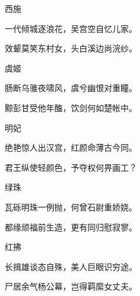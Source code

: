 \begin{poem}
    \begin{pl}西施\end{pl}


    \begin{pl}一代倾城逐浪花，吴宫空自忆儿家。\end{pl}


    \begin{pl}效颦莫笑东村女，头白溪边尚浣纱。\end{pl}
    \emptypl

    \begin{pl}虞姬\end{pl}


    \begin{pl}肠断乌骓夜啸风，虞兮幽恨对重瞳。\end{pl}


    \begin{pl}黥彭甘受他年醢，饮剑何如楚帐中。\end{pl}
    \emptypl

    \begin{pl}明妃\end{pl}


    \begin{pl}绝艳惊人出汉宫，红颜命薄古今同。\end{pl}


    \begin{pl}君王纵使轻颜色，予夺权何畀画工？\end{pl}
    \emptypl

    \begin{pl}绿珠\end{pl}


    \begin{pl}瓦砾明珠一例抛，何曾石尉重娇娆。\end{pl}


    \begin{pl}都缘顽福前生造，更有同归慰寂寥。\end{pl}
    \emptypl

    \begin{pl}红拂\end{pl}


    \begin{pl}长揖雄谈态自殊，美人巨眼识穷途。\end{pl}


    \begin{pl}尸居余气杨公幕，岂得羁縻女丈夫。\end{pl}


\end{poem}


